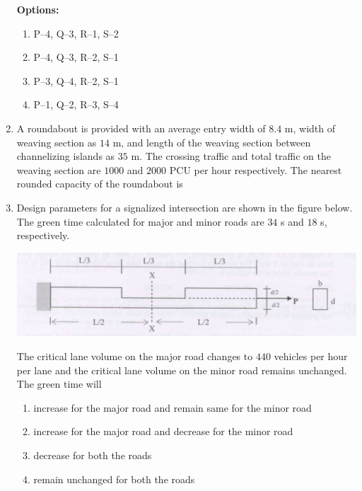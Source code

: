 \documentclass[journal]{IEEEtran}
\begin{document}
\begin{enumerate}
\textbf{Options:}
\begin{enumerate}
    \item P--4, Q--3, R--1, S--2
    \item P--4, Q--3, R--2, S--1
    \item P--3, Q--4, R--2, S--1
    \item P--1, Q--2, R--3, S--4
\end{enumerate}

\item A roundabout is provided with an average entry width of $8.4$ m, width of weaving section as $14$ m, and length of the weaving section between channelizing islands as $35$ m. The crossing traffic and total traffic on the weaving section are $1000$ and $2000$ PCU per hour respectively. The nearest rounded capacity of the roundabout  is \hfill {}
\begin{enumerate}
\end{enumerate}

\item Design parameters for a signalized intersection are shown in the figure below. The green time calculated for major and minor roads are $34$ s and $18$ s, respectively. \hfill {}

\includegraphics[width=0.6\columnwidth]{figs/fig2.png} 

The critical lane volume on the major road changes to $440$ vehicles per hour per lane and the critical lane volume on the minor road remains unchanged. The green time will


\begin{enumerate}
\item increase for the major road and remain same for the minor road
\item increase for the major road and decrease for the minor road
\item decrease for both the roads
\item remain unchanged for both the roads
\end{enumerate}  



\end{enumerate}
\end{document}
